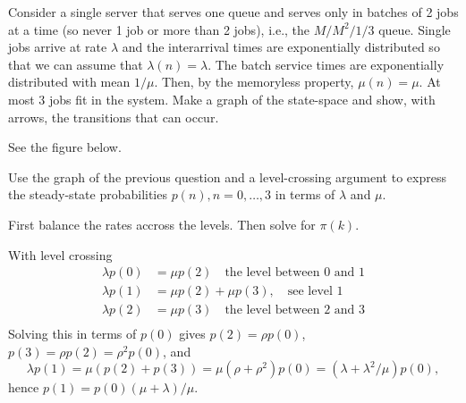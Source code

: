 \begin{exercise}
  Consider a single server that serves one queue and serves only in
  batches of 2 jobs at a time (so never 1 job or more than 2 jobs),
  i.e., the $M/M^2/1/3$ queue.  Single jobs arrive at rate $\lambda$
  and the interarrival times are exponentially distributed so that we can assume that $\lambda(n) = \lambda$. The batch service times are exponentially distributed with mean $1/\mu$. Then, by the memoryless property, $\mu(n) = \mu$. At most 3 jobs fit in the system.   Make a graph of the state-space and show, with arrows, the
  transitions that can occur.

  \begin{solution}
See the figure below.

  \end{solution}
\end{exercise}

\begin{exercise}
  Use the graph of the previous question and a level-crossing argument
  to express the steady-state probabilities $p(n),n=0,\ldots, 3$ in
  terms of $\lambda$ and $\mu$.
  \begin{hint}
First balance the rates accross the levels. Then solve for $\pi(k)$.
  \end{hint}
  \begin{solution}
With level crossing
  \begin{align*}
    \lambda p(0)  &= \mu p(2) \quad\text{the level between 0 and 1}\\
    \lambda p(1)  &= \mu p(2) +\mu p(3), \quad\text{see level 1}\\
    \lambda p(2)  &= \mu p(3)\quad\text{the level between 2 and 3}\\
  \end{align*}
  Solving this in terms of $p(0)$ gives $p(2) = \rho p(0)$, $p(3) = \rho p(2) = \rho^2p(0)$, and
  \begin{equation*}
    \lambda p(1) = \mu(p(2) + p(3)) = \mu (\rho + \rho^2) p(0) = (\lambda + \lambda^2/\mu) p(0),
  \end{equation*}
hence $p(1) = p(0)(\mu + \lambda)/\mu$. 
  \end{solution}
\end{exercise}



